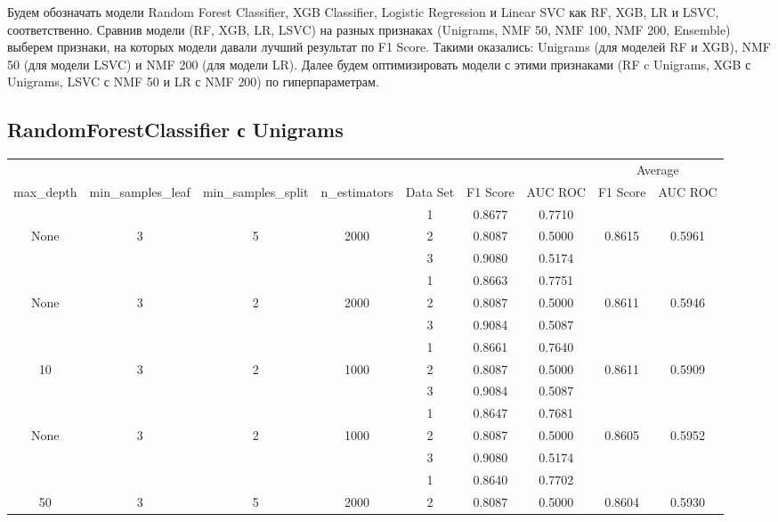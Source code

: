 \documentclass[12pt, twoside]{article}
\begin{document}
Будем обозначать модели Random Forest Classifier, XGB Classifier, Logistic Regression и Linear SVC как RF, XGB, LR и LSVC, соответственно.
Сравнив модели (RF, XGB, LR, LSVC) на разных признаках (Unigrams, NMF 50, NMF 100, NMF 200, Ensemble) выберем признаки, на которых модели давали лучший результат по F1 Score. Такими оказались: Unigrams (для моделей RF и XGB), NMF 50 (для модели LSVC) и NMF 200 (для модели LR). Далее будем оптимизировать модели с этими признаками (RF c Unigrams, XGB с Unigrams, LSVC с NMF 50 и LR с NMF 200) по гиперпараметрам.

\subsection{RandomForestClassifier с Unigrams}
\begin{landscape}
\begin{table}[!htbp]
  \centering
  \begin{tabular}{ccccccccc}
  \toprule
  {}	&	{}	&	{}	&	{}	&	{}	&	{}	&	{}	&	\multicolumn{2}{c}{Average} \\
  \cmidrule(r){8-9}
  max\_depth	&	min\_samples\_leaf	&	min\_samples\_split	&	n\_estimators	&	Data Set	&	F1 Score	&	AUC ROC	&	F1 Score	&	AUC ROC \\
  \midrule
  	&	&	&	&	1	&	0.8677	&	0.7710		&		&	 \\
  None	&	3	&	5	&	2000	&	2	&	0.8087	&	0.5000	&	0.8615	&	0.5961 \\
  	&	&	&	&	3	&	0.9080	&	0.5174	&		&	 \\
  	\cmidrule(r){5-9}
  	&	&	&	&	1	&	0.8663	&	0.7751	&		&	 \\
  None	&	3	&	2	&	2000	&	2	&	0.8087	&	0.5000	&	0.8611	&	0.5946 \\
  	&	&	&	&	3	&	0.9084	&	0.5087	&		&	 \\
  	\cmidrule(r){5-9}
  	&	&	&	&	1	&	0.8661	&	0.7640	&		&	 \\
  10	&	3	&	2	&	1000	&	2	&	0.8087	&	0.5000	&	0.8611	&	0.5909 \\
  	&	&	&	&	3	&	0.9084	&	0.5087	&		&	 \\
  	\cmidrule(r){5-9}
  	&	&	&	&	1	&	0.8647	&	0.7681	&		&	 \\
  None	&	3	&	2	&	1000	&	2	&	0.8087	&	0.5000	&	0.8605	&	0.5952 \\
  	&	&	&	&	3	&	0.9080	&	0.5174	&		&	 \\
  	\cmidrule(r){5-9}
  	&	&	&	&	1	&	0.8640	&	0.7702	&		&	 \\
  50	&	3	&	5	&	2000	&	2	&	0.8087	&	0.5000	&	0.8604	&	0.5930 \\

\end{tabular}
\end{table}
\end{landscape}
\end{document}
